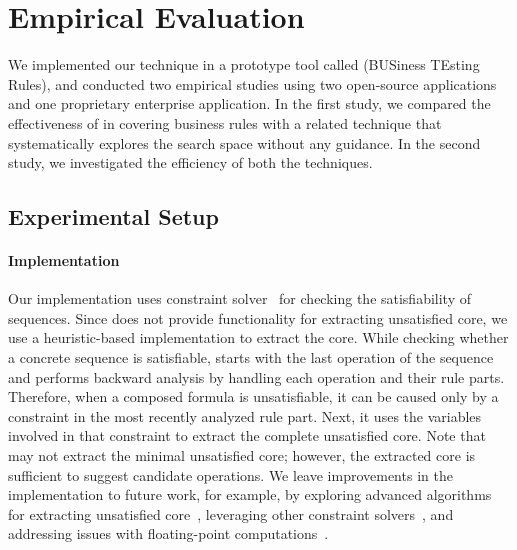 \section{Empirical Evaluation}
\label{sec:eval}

We implemented our technique in a prototype tool called \tool{} (BUSiness
TEsting Rules), and conducted two empirical studies using two open-source
applications and one proprietary enterprise application. In the first study, we
compared the effectiveness of \tool{} in covering business rules with a related
technique that systematically explores the search space without any guidance. In
the second study, we investigated the efficiency of both the techniques. %

\subsection{Experimental Setup}
\label{sec:impl}
\vspace*{-3pt}
\paragraph*{Implementation} Our implementation \tool{}  uses \choco{} constraint
solver~\cite{Choco} for checking the satisfiability of sequences. Since \choco{}
does not provide functionality for extracting unsatisfied core, we use a
heuristic-based implementation to extract the core. While checking whether a
concrete sequence is satisfiable, \tool{} starts with the last operation of the
sequence and performs backward analysis by handling each operation and their
rule parts. Therefore, when a composed formula is unsatisfiable, it can be
caused only by a constraint in the most recently analyzed rule part. Next, it
uses the variables involved in that constraint to extract the complete
unsatisfied core. Note that \tool{} may not extract the minimal unsatisfied
core; however, the extracted core is sufficient to suggest candidate
operations. We leave improvements in the implementation to future work, for
example, by exploring advanced algorithms for extracting unsatisfied
core~\cite{Liffiton:2008:ACM}, leveraging other constraint
solvers~\cite{DeMoura:2008,Delahaye:2010}, and addressing issues with
floating-point computations~\cite{bagnara:hal-00807884, GLM10}.

